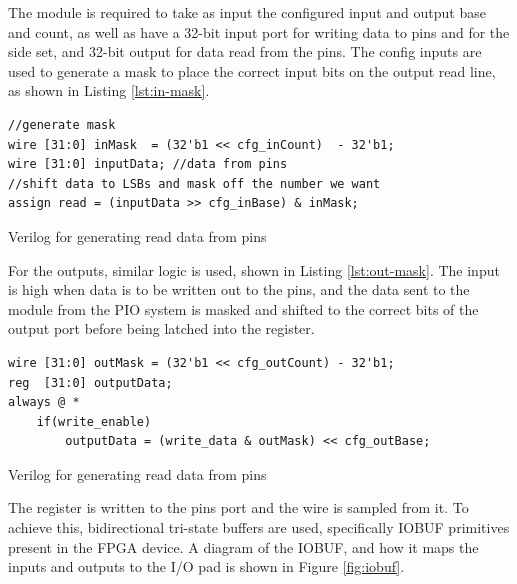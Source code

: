 The module is required to take as input the configured input and output base and count, as well as have a 32-bit input port for writing data to pins and for the side set, and 32-bit output for data read from the pins. The config inputs are used to generate a mask to place the correct input bits on the output read line, as shown in Listing \ref{lst:in-mask}.

\begin{listing}[h!]
    \vspace{0.5cm}
    \begin{verbatim}
//generate mask
wire [31:0] inMask  = (32'b1 << cfg_inCount)  - 32'b1; 
wire [31:0] inputData; //data from pins
//shift data to LSBs and mask off the number we want
assign read = (inputData >> cfg_inBase) & inMask; 
    \end{verbatim}
    \caption{Verilog for generating read data from pins}
    \label{lst:in-mask}
\end{listing}

For the outputs, similar logic is used, shown in Listing \ref{lst:out-mask}. The  input is high when data is to be written out to the pins, and the data sent to the module from the PIO system is masked and shifted to the correct bits of the output port before being latched into the register.

\begin{listing}[h!]
    \vspace{0.5cm}
    \begin{verbatim}
wire [31:0] outMask = (32'b1 << cfg_outCount) - 32'b1;    
reg  [31:0] outputData;
always @ *
    if(write_enable)
        outputData = (write_data & outMask) << cfg_outBase;
    \end{verbatim}
    \caption{Verilog for generating read data from pins}
    \label{lst:out-mask}
\end{listing}

The  register is written to the  pins port and the  wire is sampled from it. To achieve this, bidirectional tri-state buffers are used, specifically IOBUF primitives present in the FPGA device. A diagram of the IOBUF, and how it maps the inputs and outputs to the I/O pad is shown in Figure \ref{fig:iobuf}.

